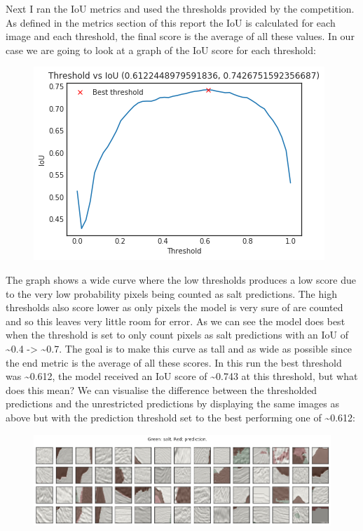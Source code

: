 \documentclass[11pt]{article}
\makeatletter
\def\maxwidth{\ifdim\Gin@nat@width>\linewidth\linewidth
    \else\Gin@nat@width\fi}
\let\Oldincludegraphics\includegraphics
\renewcommand{\includegraphics}[1]{\Oldincludegraphics[width=.8\maxwidth]{#1}}
\makeatother
\begin{document}
Next I ran the IoU metrics and used the thresholds provided by the
competition. As defined in the metrics section of this report the IoU is
calculated for each image and each threshold, the final score is the
average of all these values. In our case we are going to look at a graph
of the IoU score for each threshold:

\begin{figure}
\centering
\includegraphics{pictures/IoU.png}
\caption{}
\end{figure}

The graph shows a wide curve where the low thresholds produces a low
score due to the very low probability pixels being counted as salt
predictions. The high thresholds also score lower as only pixels the
model is very sure of are counted and so this leaves very little room
for error. As we can see the model does best when the threshold is set
to only count pixels as salt predictions with an IoU of
\textasciitilde{}0.4 -\textgreater{} \textasciitilde{}0.7. The goal is
to make this curve as tall and as wide as possible since the end metric
is the average of all these scores. In this run the best threshold was
\textasciitilde{}0.612, the model received an IoU score of
\textasciitilde{}0.743 at this threshold, but what does this mean? We
can visualise the difference between the thresholded predictions and the
unrestricted predictions by displaying the same images as above but with
the prediction threshold set to the best performing one of
\textasciitilde{}0.612:

\begin{figure}
\centering
\includegraphics{pictures/thresh-IoU.png}
\caption{}
\end{figure}
\end{document}
